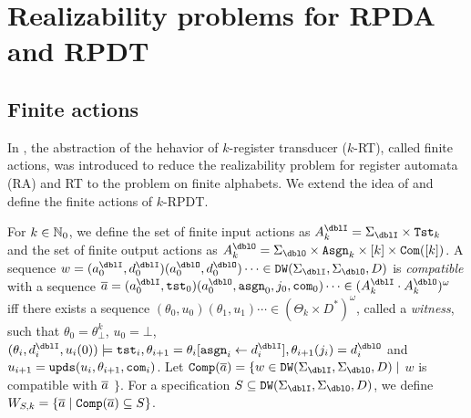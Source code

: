 \section{Realizability problems for RPDA and RPDT}


\subsection{Finite actions}
In \cite{EFR19}, the abstraction of the hehavior of $k$-register transducer ($k$-RT), called finite actions, was introduced
to reduce the realizability problem for register automata (RA) and RT to
the problem on finite alphabets.
We extend the idea of \cite{EFR19} and define the finite actions of $k$-RPDT.

For $k\in\mathbb{N}_0$,
we define the set of finite input actions as $A_k^\dblI = \Sigma_\dblI\times \Tst_k$
and the set of finite output actions as $A_k^\dblO = \Sigma_\dblO\times \Asgn_k\times [k]\times \Com([k])$.
A sequence $w = (a^\dblI_0,d^\dblI_0) (a^\dblO_0,d^\dblO_0)\cdots \in \DW(\Sigma_\dblI,\Sigma_\dblO,D)$ is \emph{compatible} with a sequence
$\overa = (a^\dblI_0, \tst_0)(a^\dblO_0,\asgn_0,j_0, \com_0)\cdots \in (A_k^\dblI\cdot A_k^\dblO)^\omega$
iff there exists a sequence $(\theta_0,u_0)(\theta_1, u_1)\cdots\in (\Theta_k\times D^*)^\omega$, called a \emph{witness}, such that
$\theta_0 = \theta^{k}_\bot$, $u_0 = \bot$,
$(\theta_i, d^\dblI_i, u_i(0)) \models \tst_i, \theta_{i+1}=\theta_i[\asgn_i\leftarrow d^\dblI_i], \theta_{i+1}(j_i) = d^\dblO_i$ and $u_{i+1}=\mathtt{upds}(u_i,\theta_{i+1},\mathtt{com}_i)$.
Let $\Comp(\overa) = \{w\in \DW(\Sigma_\dblI,\Sigma_\dblO,D)\mid$ $w$ is compatible with ${\overline{a}}$ $\}$.
For a specification $S \subseteq \DW(\Sigma_\dblI,\Sigma_\dblO,D)$, we define $W_{S,k}=\{{\overline{a}}\mid {\mathtt{Comp}}({\overline{a}})\subseteq S\}$.

